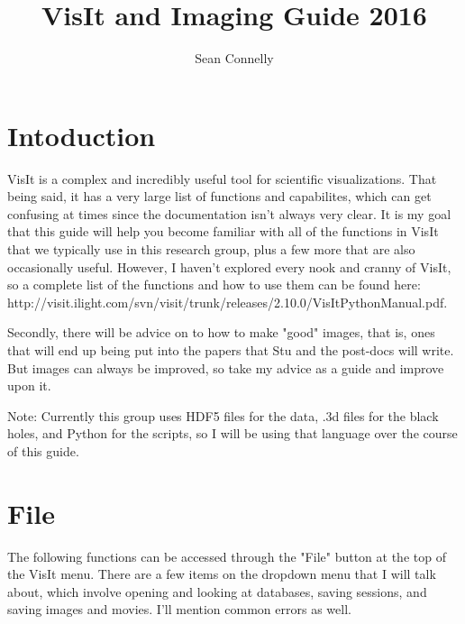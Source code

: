 \documentclass[english]{article}
\begin{document}
\title{VisIt and Imaging Guide 2016}


\author{Sean Connelly}



\maketitle
\clearpage
\section{Intoduction}

VisIt is a complex and incredibly useful tool for scientific visualizations. That being said, it has a
very large list of functions and capabilites, which can get confusing at times since the documentation
isn't always very clear. It is my goal that this guide will help you become familiar with all of the 
functions in VisIt that we typically use in this research group, plus a few more that are also 
occasionally useful. However, I haven't explored every nook and cranny of VisIt, so a complete list of
the functions and how to use them can be found here: 
http://visit.ilight.com/svn/visit/trunk/releases/2.10.0/VisItPythonManual.pdf. 

Secondly, there will be advice on to how to make "good" images, that is, ones that will end up being 
put into the papers that Stu and the post-docs will write. But images can always be improved, so take 
my advice as a guide and improve upon it. 

Note: Currently this group uses HDF5 files for the data, .3d files for the black holes, and Python for
the scripts, so I will be using that language over the course of this guide.

\section{File}

The following functions can be accessed through the "File" button at the top of the VisIt menu. There
are a few items on the dropdown menu that I will talk about, which involve opening and looking at 
databases, saving sessions, and saving images and movies. I'll mention common errors as well.
\end{document}
